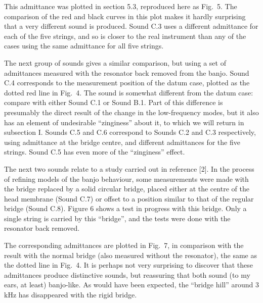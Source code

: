 \audio{}

\audio{}

\audio{}

  This admittance was plotted in section 5.3, reproduced here as Fig.\ 5. The 
  comparison of the red and black curves in this plot makes it hardly 
  surprising that a very different sound is produced. Sound C.3 uses a 
  different admittance for each of the five strings, and so is closer to the 
  real instrument than any of the cases using the same admittance for all five 
  strings. 


  The next group of sounds gives a similar comparison, but using a set of 
  admittances measured with the resonator back removed from the banjo. Sound 
  C.4 corresponds to the measurement position of the datum case, plotted as the 
  dotted red line in Fig.\ 4. The sound is somewhat different from the datum 
  case: compare with either Sound C.1 or Sound B.1. Part of this difference is 
  presumably the direct result of the change in the low-frequency modes, but it 
  also has an element of undesirable ``zinginess'' about it, to which we will 
  return in subsection I. Sounds C.5 and C.6 correspond to Sounds C.2 and C.3 
  respectively, using admittance at the bridge centre, and different 
  admittances for the five strings. Sound C.5 has even more of the 
  ``zinginess'' effect. 

\audio{}

\audio{}

\audio{}

  The next two sounds relate to a study carried out in reference [2]. In the 
  process of refining models of the banjo behaviour, some measurements were 
  made with the bridge replaced by a solid circular bridge, placed either at 
  the centre of the head membrane (Sound C.7) or offset to a position similar 
  to that of the regular bridge (Sound C.8). Figure 6 shows a test in progress 
  with this bridge. Only a single string is carried by this ``bridge'', and the 
  tests were done with the resonator back removed. 


\audio{}

\audio{}

  The corresponding admittances are plotted in Fig.\ 7, in comparison with the 
  result with the normal bridge (also measured without the resonator), the same 
  as the dotted line in Fig.\ 4. It is perhaps not very surprising to discover 
  that these admittances produce distinctive sounds, but reassuring that both 
  sound (to my ears, at least) banjo-like. As would have been expected, the 
  ``bridge hill'' around 3 kHz has disappeared with the rigid bridge. 


